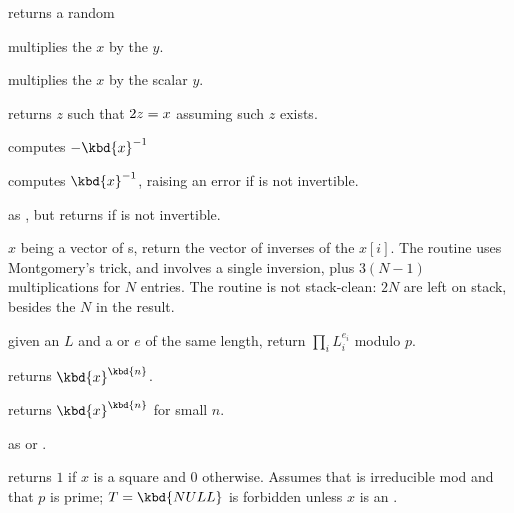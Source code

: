 
 returns a random 




 multiplies the  $x$
by the  $y$.

 multiplies the  $x$
by the scalar $y$.

 returns $z$ such that $2\*z = x$
assuming such $z$ exists.



 computes $-\kbd{x}^{-1}$

 computes $\kbd{x}^{-1}$, raising an
error if  is not invertible.

 as , but returns
 if  is not invertible.


 $x$ being a vector of s,
return the vector of inverses of the $x[i]$. The routine uses Montgomery's
trick, and involves a single inversion, plus $3(N-1)$ multiplications for
$N$ entries. The routine is not stack-clean: $2N$  are left on
stack, besides the $N$ in the result.

 given an  $L$
and a  or  $e$ of the same length, return $\prod_i L_i^{e_i}$
modulo $p$.

 returns $\kbd{x}^\kbd{n}$.

 returns $\kbd{x}^\kbd{n}$
for small $n$.

 as
 or .

 returns $1$ if $x$ is a square
and $0$ otherwise. Assumes that  is irreducible mod  and that
$p$ is prime; $T = \kbd{NULL}$ is forbidden unless $x$ is an .

